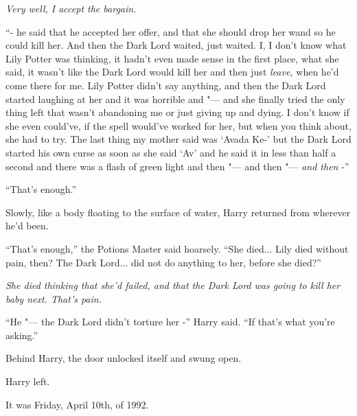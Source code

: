 \emph{Very well, I accept the bargain.}

``- he said that he accepted her offer, and that she should drop her wand
so he could kill her. And then the Dark Lord waited, just waited. I, I
don't know what Lily Potter was thinking, it hadn't even made sense in
the first place, what she said, it wasn't like the Dark Lord would kill
her and then just \emph{leave,} when he'd come there for me. Lily Potter
didn't say anything, and then the Dark Lord started laughing at her and
it was horrible and "--- and she finally tried the only thing left that
wasn't abandoning me or just giving up and dying. I don't know if she
even could've, if the spell would've worked for her, but when you think
about, she had to try. The last thing my mother said was `Avada Ke-' but
the Dark Lord started his own curse as soon as she said `Av' and he said
it in less than half a second and there was a flash of green light and
then "--- and then "--- \emph{and then} -''

``That's enough.''

Slowly, like a body floating to the surface of water, Harry returned
from wherever he'd been.

``That's enough,'' the Potions Master said hoarsely. ``She died...
Lily died without pain, then? The Dark Lord... did not do anything
to her, before she died?''

\emph{She died thinking that she'd failed, and that the Dark Lord was
going to kill her baby next. That's pain.}

``He "--- the Dark Lord didn't torture her -'' Harry said. ``If that's what
you're asking.''

Behind Harry, the door unlocked itself and swung open.

Harry left.

It was Friday, April 10th, of 1992.
